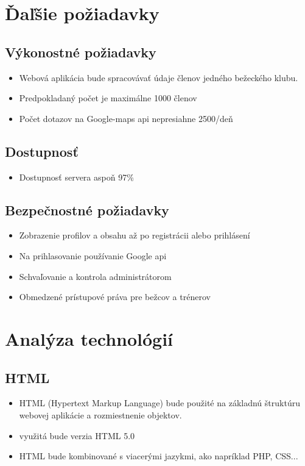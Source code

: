 \documentclass[12pt,a4paper]{report}
\theoremstyle{definition}
\theoremstyle{remark}
\begin{document}


\chapter{Ďaľšie požiadavky}

\section{Výkonostné požiadavky}

\begin{itemize}  
\item Webová aplikácia bude spracovávať údaje členov jedného bežeckého klubu. 
\item Predpokladaný počet je maximálne 1000 členov
\item Počet dotazov na Google-maps api nepresiahne 2500/deň 
\end{itemize}

\section{Dostupnosť}
\begin{itemize}  
\item Dostupnosť servera aspoň 97\%
\end{itemize}

\section{Bezpečnostné požiadavky}
\begin{itemize}  
\item Zobrazenie profilov a obsahu až po registrácii alebo prihlásení
\item Na prihlasovanie používanie Google api
\item Schvaľovanie a kontrola administrátorom 
\item Obmedzené prístupové práva pre bežcov a trénerov
\end{itemize}

\chapter{Analýza technológií}

\section{HTML}
\begin{itemize}
\item HTML (Hypertext Markup Language) bude použité na základnú štruktúru webovej aplikácie a rozmiestnenie objektov.
\item využitá bude verzia HTML 5.0
\item HTML bude kombinované s viacerými jazykmi, ako napríklad PHP, CSS...
\end{itemize}
\end{document}
